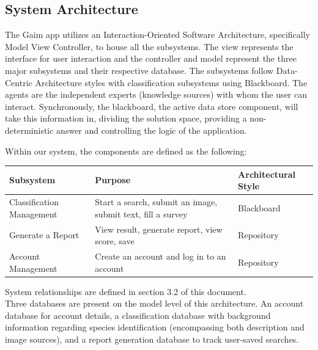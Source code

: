 \documentclass[]{article}
\begin{document}
\subsection{System Architecture}
\label{sub:system_architecture}
The Gaim app utilizes an Interaction-Oriented Software Architecture, specifically Model View Controller, to house all the subsystems. The view represents the interface for user interaction and the controller and model represent the three major subsystems and their respective database. The subsystems follow Data-Centric Architecture styles with classification subsystems using Blackboard. The agents are the independent experts (knowledge sources) with whom the user can interact. Synchronously, the blackboard, the active data store component, will take this information in, dividing the solution space, providing a non-deterministic answer and controlling the logic of the application. \\

\begin{table}[h]
Within our system, the components are defined as the following:  
    \centering
    \renewcommand{\arraystretch}{1.3}
    \begin{tabular}{| m{5cm} | m{6cm} | m{4cm} |}
        \hline
        \textbf{Subsystem} & \textbf{Purpose} & \textbf{Architectural Style} \\
        \hline
        Classification Management & Start a search, submit an image, submit text, fill a survey & Blackboard \\
        \hline
        Generate a Report & View result, generate report, view score, save & Repository \\
        \hline
        Account Management & Create an account and log in to an account & Repository \\
        \hline
    \end{tabular}
\end{table}

System relationships are defined in section 3.2 of this document. 
\\

Three databases are present on the model level of this architecture. An account database for account details, a classification database with background information regarding species identification (encompassing both description and image sources), and a report generation database to track user-saved searches. 
\\
\end{document}

